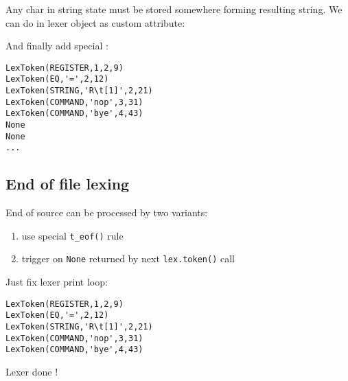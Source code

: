 Any char in string state must be stored somewhere forming resulting string. We
can do in lexer object as custom attribute:


And finally add special :

\begin{lstlisting}
LexToken(REGISTER,1,2,9)
LexToken(EQ,'=',2,12)
LexToken(STRING,'R\t[1]',2,21)
LexToken(COMMAND,'nop',3,31)
LexToken(COMMAND,'bye',4,43)
None
None
...
\end{lstlisting}

\subsection{End of file lexing}

End of source can be processed by two variants:
\begin{enumerate}[nosep]
  \item use special \verb|t_eof()| rule
  \item trigger on \verb|None| returned by next \verb|lex.token()| call 
\end{enumerate}

Just fix lexer print loop:

\begin{lstlisting}
LexToken(REGISTER,1,2,9)
LexToken(EQ,'=',2,12)
LexToken(STRING,'R\t[1]',2,21)
LexToken(COMMAND,'nop',3,31)
LexToken(COMMAND,'bye',4,43)
\end{lstlisting}

\begin{center}{\Huge Lexer done !}\end{center}
